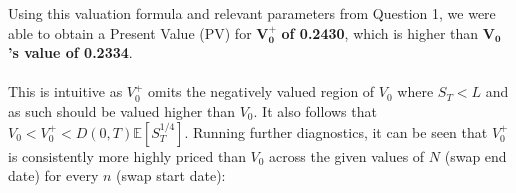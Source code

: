 \documentclass{article}
\begin{document}
\noindent Using this valuation formula and relevant parameters from Question 1, we were able to obtain a Present Value (PV) for $\boldsymbol{V_0^+}$\textbf{ of 0.2430}, which is higher than $\boldsymbol{V_0}$\textbf{'s value of 0.2334}. \\ \\

\noindent This is intuitive as $V_0^+$ omits the negatively valued region of $V_0$ where $S_T < L$ and as such should be valued higher than $V_0$. It also follows that $V_0<V_0^+< D(0,T) \mathbb{E} \left[ S_T^{1/4} \right]$. Running further diagnostics, it can be seen that $V_0^+$ is consistently more highly priced than $V_0$ across the given values of $N$ (swap end date) for every $n$ (swap start date):

\begin{figure}[h]
	\centering
	\hspace{0.05em}
	\hspace{0.05em}
\end{figure}
\end{document}
